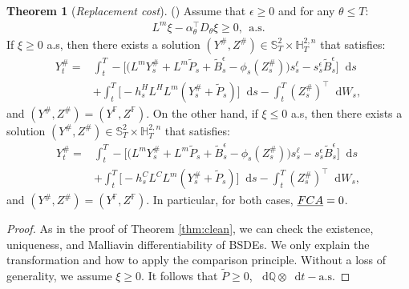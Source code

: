\documentclass[a4paper, 11pt]{article}              %
\numberwithin{equation}{section}
\theoremstyle{plain}
\newcommand{\dqdt}{\df \dsQ \otimes \df t-\text{a.s}}
\newcommand{\1}{\mathds{1}}
\newcommand{\Bt}{\tilde{B}}
\newcommand{\pt}{\tilde{P}}
\newcommand{\dsF}{\mathbb{F}}
\newcommand{\dsH}{\mathbb{H}}
\newcommand{\dsQ}{\mathbb{Q}}
\newcommand{\dsS}{\mathbb{S}}
\theoremstyle{plain}
\newtheorem{theorem}[thm]{Theorem}
\theoremstyle{definition}
\newtheorem{theorem}{Theorem}
\theoremstyle{plain}
\newcommand*\df{\mathop{}\!\mathrm{d}}
\newcommand{\rom}[1]{\lowercase\expandafter{\romannumeral #1\relax}}
\begin{document}
\begin{theorem}[\textit{Replacement cost}]
(\rom{2}) Assume that $\epsilon \geq0$ and for any $\theta \leq T$:
\begin{align}
  L^m\xi - \alpha_\theta^\top D_\theta\xi \geq0, ~~\text{a.s.} \label{thm2:cond}
\end{align}
If $\xi \geq0 $ a.s, then there exists a solution
$(Y^\#, Z^\#)\in \dsS^2_T \times \dsH^{2, n}_T$ that satisfies:
\begin{align}
  Y^\#_t =& \int_{t}^{T} -\bigg[\Big(L^mY^\#_s +L^m\pt_s+\Bt^\epsilon_s-\phi_s(Z^\#_s)\Big)s^{\ell}_s-s^\epsilon_s\Bt^\epsilon_s\bigg]\df s\nonumber\\
  &+\int_{t}^{T}
    \big[-h^H_sL^HL^m(Y^\#_s+\pt_s)\big]\df s
    -\int_{t}^{T}(Z^\#_s)^\top\df W_s, \nonumber 
\end{align}
and $(Y^\#, Z^\#)=(Y^\dsF, Z^\dsF)$. On the other hand, if $\xi \leq0 $ a.s, then there exists a solution $(Y^\#, Z^\#)\in \dsS^2_T \times \dsH^{2, n}_T$ that satisfies:
\begin{align}
  Y^\#_t =& \int_{t}^{T} -\bigg[\Big(L^mY^\#_s +L^m\pt_s+\Bt^\epsilon_s-\phi_s(Z^\#_s)\Big)s^{\ell}_s-s^\epsilon_s\Bt^\epsilon_s\bigg]\df s\nonumber\\
  &+\int_{t}^{T}
    \big[-h^C_sL^CL^m(Y^\#_s+\pt_s)\big]\df s
    -\int_{t}^{T}(Z^\#_s)^\top\df W_s, \nonumber 
\end{align}
and $(Y^\#, Z^\#)=(Y^\dsF, Z^\dsF)$. In particular, for both cases, $\emph{FCA}=0$. 
\begin{proof}
  As in the proof of Theorem \ref{thm:clean}, we can check the existence,
  uniqueness, and Malliavin differentiability of BSDEs. We only explain the
  transformation and how to apply the comparison principle. Without a loss of
  generality, we assume $\xi \geq0$. It follows that $\pt \geq0$, $\dqdt$.


\end{proof}
\end{theorem}
\end{document}
